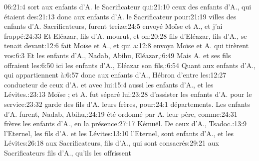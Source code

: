 \begin{multicols}{3}
{06:21:4	sort aux enfants d'A. le Sacrificateur qui:21:10	ceux des enfants d'A., qui étaient des:21:13	donc aux enfants d'A. le Sacrificateur pour:21:19	villes des enfants d'A. Sacrificateurs, furent treize:24:5	envoyé Moïse et A., et j'ai frappé:24:33	Et Eléazar, fils d'A. mourut, et on:20:28	fils d'Eléazar, fils d'A., se tenait devant:12:6	fait Moïse et A., et qui a:12:8	envoya Moïse et A. qui tirèrent vos:6:3	Et les enfants d'A., Nadab, Abihu, Eléazar,:6:49	Mais A. et ses fils offraient les:6:50	ici les enfants d'A., Eléazar son fils,:6:54	Quant aux enfants d'A., qui appartiennent à:6:57	donc aux enfants d'A., Hébron d'entre les:12:27	conducteur de ceux d'A. et avec lui:15:4	aussi les enfants d'A., et les Lévites.:23:13	Moïse ; et A. fut séparé lui:23:28	d'assister les enfants d'A. pour le service:23:32	garde des fils d'A. leurs frères, pour:24:1	départements. Les enfants d'A. furent, Nadab, Abihu,:24:19	été ordonné par A. leur père, comme:24:31	frères les enfants d'A., en la présence:27:17	Kémuël. De ceux d'A., Tsadoc.:13:9	l'Eternel, les fils d'A. et les Lévites:13:10	l'Eternel, sont enfants d'A., et les Lévites:26:18	aux Sacrificateurs, fils d'A., qui sont consacrés:29:21	aux Sacrificateurs fils d'A., qu'ils les offrissent\newline
}
\end{multicols}
